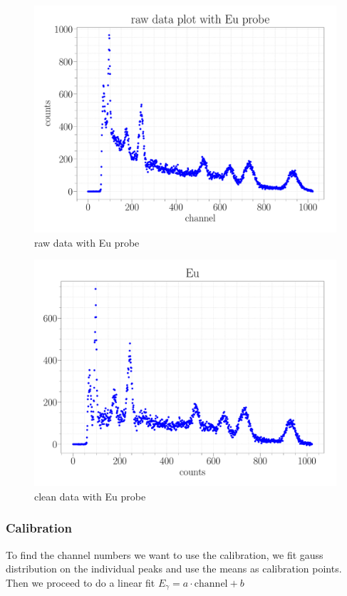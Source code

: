 \documentclass[a4paper,12pt]{article}
\begin{document}
\begin{figure}
\center
\includegraphics[scale=0.3]{../Figures/Eu_raw.pdf}
\caption{raw data with Eu probe}
\label{Eu_raw}
\end{figure}

\begin{figure}
\center
\includegraphics[scale=0.3]{../Figures/Eu.pdf}
\caption{clean data with Eu probe}
\label{Eu}
\end{figure}

\subsubsection{Calibration}
To find the channel numbers we want to use the calibration, we fit gauss distribution on the individual peaks and use the means as calibration points.
Then we proceed to do a linear fit $E_\gamma = a \cdot \mathrm{channel}+ b$ 
\end{document}
